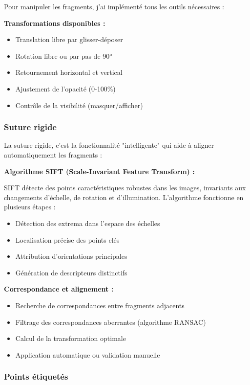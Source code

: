 \documentclass[11pt,a4paper]{report}
\begin{document}
Pour manipuler les fragments, j'ai implémenté tous les outils nécessaires :

\textbf{Transformations disponibles :}
\begin{itemize}
\item Translation libre par glisser-déposer
\item Rotation libre ou par pas de 90°
\item Retournement horizontal et vertical
\item Ajustement de l'opacité (0-100\%)
\item Contrôle de la visibilité (masquer/afficher)
\end{itemize}

\subsubsection{Suture rigide}

La suture rigide, c'est la fonctionnalité "intelligente" qui aide à aligner automatiquement les fragments :

\textbf{Algorithme SIFT (Scale-Invariant Feature Transform) :}

SIFT détecte des points caractéristiques robustes dans les images, invariants aux changements d'échelle, de rotation et d'illumination. L'algorithme fonctionne en plusieurs étapes :

\begin{itemize}
\item Détection des extrema dans l'espace des échelles
\item Localisation précise des points clés
\item Attribution d'orientations principales
\item Génération de descripteurs distinctifs
\end{itemize}

\textbf{Correspondance et alignement :}
\begin{itemize}
\item Recherche de correspondances entre fragments adjacents
\item Filtrage des correspondances aberrantes (algorithme RANSAC)
\item Calcul de la transformation optimale
\item Application automatique ou validation manuelle
\end{itemize}

\subsubsection{Points étiquetés}
\end{document}
